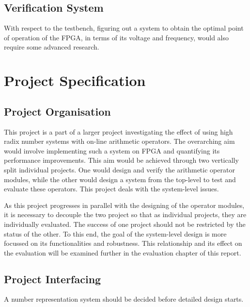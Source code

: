 \documentclass[journal]{IEEEtran}
\begin{document}
\subsection{Verification System}
With respect to the testbench, figuring out a system to obtain the optimal point
of operation of the FPGA, in terms of its voltage and frequency, would also
require some advanced research.

\section{Project Specification}

\subsection{Project Organisation}
This project is a part of a larger project investigating the effect of using
high radix number systems with on-line arithmetic operators.
The overarching aim would involve implementing such a system on FPGA and
quantifying its performance improvements.
This aim would be achieved through two vertically split individual projects.
One would design and verify the arithmetic operator modules,
while the other would design a system from the top-level to test and
evaluate these operators.
This project deals with the system-level issues.

As this project progresses in parallel with the designing of the operator
modules, it is necessary to decouple the two project so that as individual
projects, they are individually evaluated.
The success of one project should not be restricted by the status of the other.
To this end, the goal of the system-level design is more focussed on its
functionalities and robustness.
This relationship and its effect on the evaluation will be examined further in
the evaluation chapter of this report.

\subsection{Project Interfacing}
A number representation system should be decided before detailed design starts.
\end{document}
